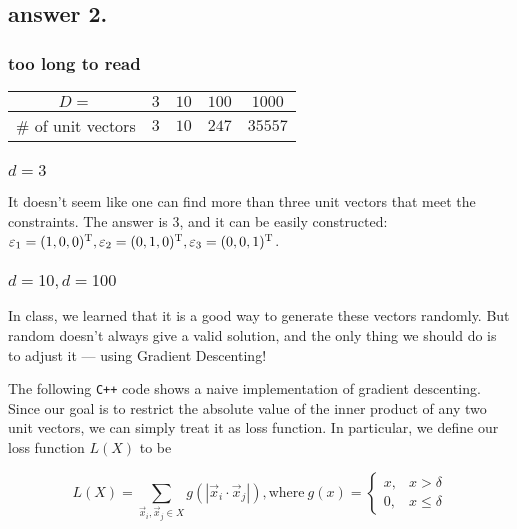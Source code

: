 \documentclass[12pt]{article}%
\begin{document}
\subsection*{answer 2.}
\subsubsection*{too long to read}
	\begin{center}
		\begin{tabular}{|c|c|c|c|c|}
			\hline 
			$D = $ & $3$ & $10$ & $100$ & $1000$ \\ 
			\hline 
			\# of unit vectors & $3$ & $10$ & $247$ & $35557$\\
			\hline
		\end{tabular}
	\end{center}
\subsubsection*{$d = 3$}
	It doesn't seem like one can find more than three unit vectors that meet the constraints. The answer is $3$, and it can be easily constructed: $\varepsilon_1 = (1, 0, 0)^{\text T}, \varepsilon_2 = (0, 1, 0)^{\text T}, \varepsilon_3 = (0, 0, 1)^{\text T}$.
\subsubsection*{$d = 10, d = 100$}
	In class, we learned that it is a good way to generate these vectors randomly. But random doesn't always give a valid solution, and the only thing we should do is to adjust it --- using Gradient Descenting! 
	
	The following \texttt{C++} code shows a naive implementation of gradient descenting. Since our goal is to restrict the absolute value of the inner product of any two unit vectors, we can simply treat it as loss function. In particular, we define our loss function $L(X)$ to be
	
	$$L(X) = \sum_{\vec{x}_i, \vec{x}_j \in X}g(|\vec{x}_i \cdot \vec{x}_j|), \mathrm{where}\ g(x) = \begin{cases}
	x, & x > \delta\\0, & x \le \delta
	\end{cases}$$
	
\end{document}
